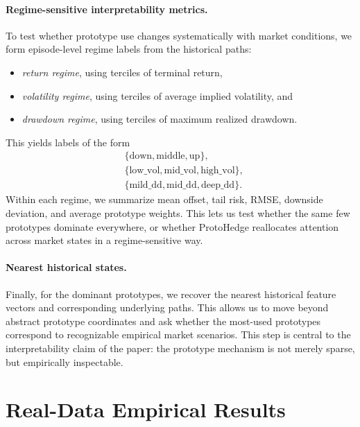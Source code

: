\documentclass[sigconf]{acmart}
\begin{document}
\paragraph{Regime-sensitive interpretability metrics.}
To test whether prototype use changes systematically with market conditions, we form episode-level regime labels from the historical paths:
\begin{itemize}
    \item \emph{return regime}, using terciles of terminal return,
    \item \emph{volatility regime}, using terciles of average implied volatility, and
    \item \emph{drawdown regime}, using terciles of maximum realized drawdown.
\end{itemize}
This yields labels of the form
\[
\begin{aligned}
&\{\text{down},\text{middle},\text{up}\},\\
&\{\text{low\_vol},\text{mid\_vol},\text{high\_vol}\},\\
&\{\text{mild\_dd},\text{mid\_dd},\text{deep\_dd}\}.
\end{aligned}
\]
Within each regime, we summarize mean offset, tail risk, RMSE, downside
deviation, and average prototype weights. This lets us test whether the same
few prototypes dominate everywhere, or whether ProtoHedge reallocates
attention across market states in a regime-sensitive way.

\paragraph{Nearest historical states.}
Finally, for the dominant prototypes, we recover the nearest historical feature vectors and corresponding underlying paths. This allows us to move beyond abstract prototype coordinates and ask whether the most-used prototypes correspond to recognizable empirical market scenarios. This step is central to the interpretability claim of the paper: the prototype mechanism is not merely sparse, but empirically inspectable.










\section{Real-Data Empirical Results}
\label{sec:empirical_results}
\end{document}
